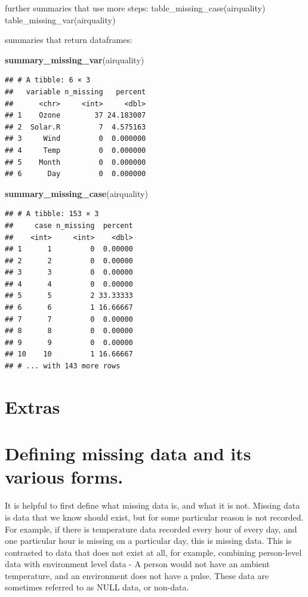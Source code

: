 \documentclass[]{article}
\newenvironment{Shaded}{\begin{snugshade}}{\end{snugshade}}
\newcommand{\KeywordTok}[1]{\textcolor[rgb]{0.13,0.29,0.53}{\textbf{{#1}}}}
\newcommand{\NormalTok}[1]{{#1}}
\begin{document}
further summaries that use more steps: table\_missing\_case(airquality)
table\_missing\_var(airquality)

summaries that return dataframes:

\begin{Shaded}
\begin{Highlighting}[]
\KeywordTok{summary_missing_var}\NormalTok{(airquality)}
\end{Highlighting}
\end{Shaded}

\begin{verbatim}
## # A tibble: 6 × 3
##   variable n_missing   percent
##      <chr>     <int>     <dbl>
## 1    Ozone        37 24.183007
## 2  Solar.R         7  4.575163
## 3     Wind         0  0.000000
## 4     Temp         0  0.000000
## 5    Month         0  0.000000
## 6      Day         0  0.000000
\end{verbatim}

\begin{Shaded}
\begin{Highlighting}[]
\KeywordTok{summary_missing_case}\NormalTok{(airquality)}
\end{Highlighting}
\end{Shaded}

\begin{verbatim}
## # A tibble: 153 × 3
##     case n_missing  percent
##    <int>     <int>    <dbl>
## 1      1         0  0.00000
## 2      2         0  0.00000
## 3      3         0  0.00000
## 4      4         0  0.00000
## 5      5         2 33.33333
## 6      6         1 16.66667
## 7      7         0  0.00000
## 8      8         0  0.00000
## 9      9         0  0.00000
## 10    10         1 16.66667
## # ... with 143 more rows
\end{verbatim}

\section{Extras}\label{extras}

\section{Defining missing data and its various
forms.}\label{defining-missing-data-and-its-various-forms.}

It is helpful to first define what missing data is, and what it is not.
Missing data is data that we know should exist, but for some particular
reason is not recorded. For example, if there is temperature data
recorded every hour of every day, and one particular hour is missing on
a particular day, this is missing data. This is contrasted to data that
does not exist at all, for example, combining person-level data with
environment level data - A person would not have an ambient temperature,
and an environment does not have a pulse. These data are sometimes
referred to as NULL data, or non-data.
\end{document}
